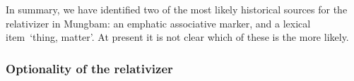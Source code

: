 \documentclass[10pt,twoside]{article}
\newcommand{\gl}[1]{`#1'}
\newcommand{\sref}[1]{Section \ref{#1}}
\newcommand{\comment}[1]{\textcolor{blue}{\emph{#1}}}
\begin{document}
In summary, we have identified two of the most likely historical sources
for the relativizer in Mungbam: an emphatic associative marker, and a lexical
item~\gl{thing, matter}. At present it is not clear which of these
is the more likely.
%
%

\subsubsection{Optionality of the relativizer}
%
\end{document}
